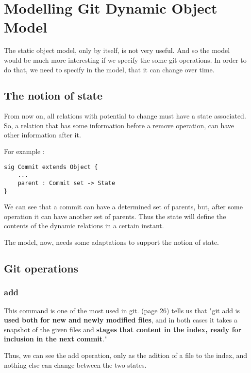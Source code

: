 \section {Modelling Git Dynamic Object Model}

The static object model, only by itself, 
is not very useful. And so
the model would be much more interesting if we specify 
the some git operations. In order to do that, we need to 
specify in the model, that it can change over time.

\subsection{The notion of state}

From now on, all relations with potential to change must
have a state associated. So, a relation
that has some information before a remove operation, can have
other information after it. \par
For example :

\begin{lstlisting}
sig Commit extends Object {
	...
	parent : Commit set -> State
}
\end{lstlisting}

We can see that a commit can have a determined set of parents, but, 
after some operation it can have another set of parents. Thus the state
will define the contents of the dynamic relations in a certain instant.
\par
The model, now, needs some adaptations to support the notion of state. \par


\subsection{Git operations}

\subsubsection{add}

This command is one of the most used in git. \cite{gitComm} (page 26)
tells us that
"git add is {\bf used both for new and newly modified files},
and in both cases it takes a snapshot of the given files
and {\bf stages that content in the index, ready for inclusion
in the next commit}." \par 
Thus, we can see the add operation, only as the adition of a file 
to the index, and nothing else can change between the two states.
\par

